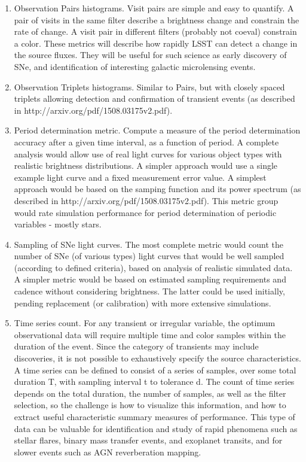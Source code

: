 \begin{enumerate}
\item Observation Pairs histograms.  Visit pairs are simple and easy to quantify.  A pair of visits in the same filter describe a brightness change and constrain the rate of change. A visit pair in different filters (probably not coeval) constrain a color.  These metrics will describe how rapidly LSST can detect a change in the source fluxes. They will be useful for such science as early discovery of SNe, and identification of interesting galactic microlensing events.

\item Observation Triplets histograms. Similar to Pairs, but with closely spaced triplets allowing detection and confirmation of transient events (as described in http://arxiv.org/pdf/1508.03175v2.pdf).

\item Period determination metric.  Compute a measure of the period determination accuracy after a given time interval, as a function of period. A complete analysis would allow use of real light curves for various object types with realistic brightness distributions.  A simpler approach would use a single example light curve and a fixed measurement error value. A simplest approach would be based on the samping function and its power spectrum (as described in http://arxiv.org/pdf/1508.03175v2.pdf).  This metric group would rate simulation performance for period determination of periodic variables - mostly stars.

\item Sampling of SNe light curves.  The most complete metric would count the number of SNe (of various types) light curves that would be well sampled (according to defined criteria), based on analysis of realistic simulated data.  A simpler metric would be based on estimated sampling requirements and cadence without considering brightness. The latter could be used initially, pending replacement (or calibration) with more extensive simulations.

\item Time series count. For any transient or irregular variable, the optimum observational data will require multiple time and color samples within the duration of the event. Since the category of transients may include discoveries, it is not possible to exhaustively specify the source characteristics. A time series can be defined to consist of a series of samples, over some total duration T, with sampling interval t to tolerance d. The count of time series depends on the total duration, the number of samples, as well as the filter selection, so the challenge is how to visualize this information, and how to extract useful characteristic summary measures of performance.  This type of data can be valuable for identification and study of rapid phenomena such as stellar flares, binary mass transfer events, and exoplanet transits, and for slower events such as AGN reverberation mapping.

\end{enumerate}


